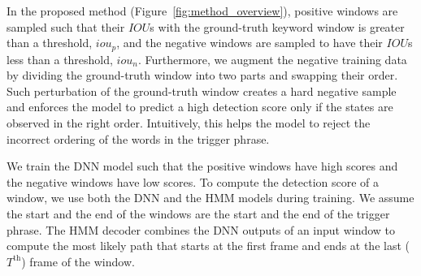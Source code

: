 \documentclass{article}
\begin{document}
In the proposed method (Figure~\ref{fig:method_overview}), positive windows are sampled such that their $IOU$s with the ground-truth keyword window is greater than a threshold, $iou_p$, and the negative windows are sampled to have their $IOU$s less than a threshold, $iou_n$.
Furthermore, we augment the negative training data by dividing the ground-truth window into two parts and swapping their order.
Such perturbation of the ground-truth window creates a hard negative sample and enforces the model to predict a high detection score only if the states are observed in the right order.
Intuitively, this helps the model to reject the incorrect ordering of the words in the trigger phrase.

We train the DNN model such that the positive windows have high scores and the negative windows have low scores.
To compute the detection score of a window, we use both the DNN and the HMM models during training.
We assume the start and the end of the windows are the start and the end of the trigger phrase.
The HMM decoder combines the DNN outputs of an input window to compute the most likely path that starts at the first frame and ends at the last ($T^{\text{th}}$) frame of the window.
\end{document}

